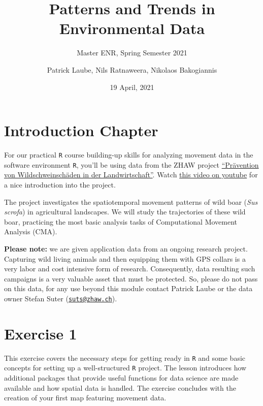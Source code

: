 \documentclass[
]{book}
\title{Patterns and Trends in Environmental Data}
\subtitle{Master ENR, Spring Semester 2021}
\author{Patrick Laube, Nils Ratnaweera, Nikolaos Bakogiannis}
\date{19 April, 2021}
\begin{document}
\maketitle

{
\setcounter{tocdepth}{1}
\tableofcontents
}
\hypertarget{introduction-chapter}{%
\chapter*{Introduction Chapter}\label{introduction-chapter}}

For our practical \texttt{R} course building-up skills for analyzing movement data in the software environment \texttt{R}, you'll be using data from the ZHAW project \href{https://www.zhaw.ch/de/ueber-uns/aktuell/news/detailansicht-news/event-news/wildschweinschaeden-mit-akustischer-methode-verhindern/}{``Prävention von Wildschweinschäden in der Landwirtschaft''}. Watch \href{https://youtu.be/WYXnCQMfPiI}{this video on youtube} for a nice introduction into the project.

The project investigates the spatiotemporal movement patterns of wild boar (\emph{Sus scrofa}) in agricultural landscapes. We will study the trajectories of these wild boar, practicing the most basic analysis tasks of Computational Movement Analysis (CMA).

\textbf{Please note:} we are given application data from an ongoing research project. Capturing wild living animals and then equipping them with GPS collars is a very labor and cost intensive form of research. Consequently, data resulting such campaigns is a very valuable asset that must be protected. So, please do not pass on this data, for any use beyond this module contact Patrick Laube or the data owner Stefan Suter (\href{mailto:suts@zhaw.ch}{\nolinkurl{suts@zhaw.ch}}).

\hypertarget{exercise-1}{%
\chapter{Exercise 1}\label{exercise-1}}

This exercise covers the necessary steps for getting ready in \texttt{R} and some basic concepts for setting up a well-structured \texttt{R} project. The lesson introduces how additional packages that provide useful functions for data science are made available and how spatial data is handled. The exercise concludes with the creation of your first map featuring movement data.
\end{document}
